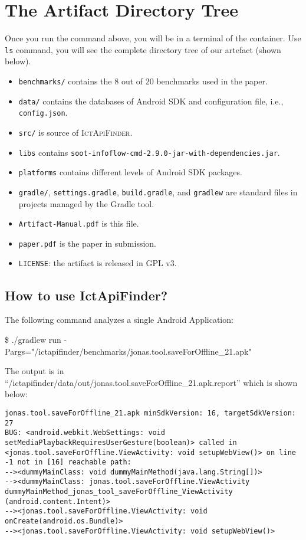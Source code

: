 \documentclass[11pt]{article}
\begin{document}
\section{The Artifact Directory Tree}
Once you run the command above, you will be in a terminal of the container. 
Use \texttt{ls} command, you will see the complete directory tree of our artefact (shown below).

\begin{itemize}
	\item \texttt{benchmarks/} contains the 8 out of 20 benchmarks used in the paper.
	\item \texttt{data/} contains the databases of Android SDK and configuration file, i.e., \texttt{config.json}.
	\item \texttt{src/} is source of \textsc{IctApiFinder}.
	\item \texttt{libs} contains  \texttt{soot-infoflow-cmd-2.9.0-jar-with-dependencies.jar}.
	\item \texttt{platforms} contains different levels of Android SDK packages.
	\item \texttt{gradle/}, \texttt{settings.gradle}, \texttt{build.gradle}, and \texttt{gradlew} are standard files in projects managed by the Gradle tool.
	\item \texttt{Artifact-Manual.pdf} is this file.
	\item \texttt{paper.pdf} is the paper in submission.
	\item \texttt{LICENSE}: the artifact is released in GPL v3.
\end{itemize}

\subsection{How to use IctApiFinder?}
The following command analyzes a single Android Application:
\begin{framed}
\noindent\$ ./gradlew run -Pargs="/ictapifinder/benchmarks/jonas.tool.saveForOffline\_21.apk"
\end{framed}
The output is in ``/ictapifinder/data/out/jonas.tool.saveForOffline\_21.apk.report'' which is shown below:
\begin{lstlisting}[basicstyle=\tiny]
jonas.tool.saveForOffline_21.apk minSdkVersion: 16, targetSdkVersion: 27
BUG: <android.webkit.WebSettings: void setMediaPlaybackRequiresUserGesture(boolean)> called in
<jonas.tool.saveForOffline.ViewActivity: void setupWebView()> on line -1 not in [16] reachable path:
--><dummyMainClass: void dummyMainMethod(java.lang.String[])>
--><dummyMainClass: jonas.tool.saveForOffline.ViewActivity dummyMainMethod_jonas_tool_saveForOffline_ViewActivity
(android.content.Intent)>
--><jonas.tool.saveForOffline.ViewActivity: void onCreate(android.os.Bundle)>
--><jonas.tool.saveForOffline.ViewActivity: void setupWebView()>
\end{lstlisting}
\end{document}
